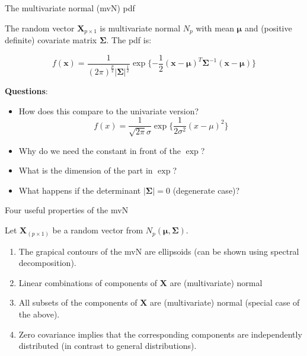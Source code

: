 \documentclass[ignorenonframetext,]{beamer}
\begin{document}
\begin{frame}

\begin{block}{The multivariate normal (mvN) pdf}

\vspace{2mm}

The random vector \(\boldsymbol{X}_{p\times 1}\) is multivariate normal
\(N_p\) with mean \(\boldsymbol{\mu}\) and (positive definite) covariate
matrix \(\boldsymbol\Sigma\). The pdf is:

\[f(\boldsymbol{x})=\frac{1}{(2\pi)^\frac{p}{2}|\boldsymbol\Sigma|^\frac{1}{2}} \exp\{-\frac{1}{2}(\boldsymbol{x}-\boldsymbol{\mu})^T\boldsymbol\Sigma^{-1}(\boldsymbol{x}-\boldsymbol{\mu})\}\]

\textbf{Questions}:

\begin{itemize}
\item
  How does this compare to the univariate version?
  \[f(x)=\frac{1}{\sqrt{2\pi}\sigma}\exp\{ \frac{1}{2\sigma^2}(x-\mu)^2\}\]
\item
  Why do we need the constant in front of the \(\exp\)?
\item
  What is the dimension of the part in \(\exp\)?
\item
  What happens if the determinant \(|\boldsymbol\Sigma| = 0\)
  (degenerate case)? 
\end{itemize}

\end{block}

\end{frame}

\begin{frame}

\begin{block}{Four useful properties of the mvN}

\vspace{2mm}

Let \(\boldsymbol{X}_{(p\times 1)}\) be a random vector from
\(N_p(\boldsymbol{\mu},\boldsymbol\Sigma)\).

\begin{enumerate}
\def\labelenumi{\arabic{enumi}.}
\item
  The grapical contours of the mvN are ellipsoids (can be shown using
  spectral decomposition).
\item
  Linear combinations of components of \(\boldsymbol{X}\) are
  (multivariate) normal
\item
  All subsets of the components of \(\boldsymbol{X}\) are (multivariate)
  normal (special case of the above).
\item
  Zero covariance implies that the corresponding components are
  independently distributed (in contrast to general distributions).
\end{enumerate}

\end{block}

\end{frame}
\end{document}
